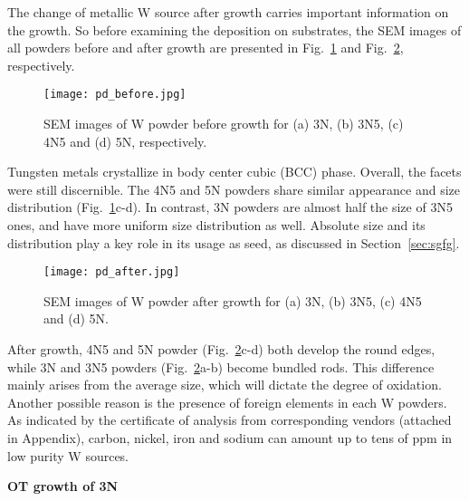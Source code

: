 The change of metallic W source after growth carries important information on the growth. So before examining the deposition on substrates, the SEM images of all powders before and after growth are presented in Fig.~\ref{fig:pdbefore} and Fig.~\ref{fig:pdafter}, respectively.
\begin{figure}[htb]
\centering
\texttt{[image: pd\_before.jpg]}
\caption[SEM images of W powder before growth]{SEM images of W powder before growth for (a) 3N, (b) 3N5, (c) 4N5 and (d) 5N, respectively.}
\label{fig:pdbefore}
\end{figure}
Tungsten metals crystallize in body center cubic (BCC) phase. Overall, the facets were still discernible. The 4N5 and 5N powders share similar appearance and size distribution (Fig.~\ref{fig:pdbefore}c-d). In contrast, 3N powders are almost half the size of 3N5 ones, and have more uniform size distribution as well. Absolute size and its distribution play a key role in its usage as seed, as discussed in Section~\ref{sec:sgfg}.
\begin{figure}[htb]
\centering
\texttt{[image: pd\_after.jpg]}
\caption[SEM images of W powder after growth]{SEM images of W powder after growth for (a) 3N, (b) 3N5, (c) 4N5 and (d) 5N. }
\label{fig:pdafter}
\end{figure}
After growth, 4N5 and 5N powder (Fig.~\ref{fig:pdafter}c-d) both develop the round edges, while 3N and 3N5 powders (Fig.~\ref{fig:pdafter}a-b) become bundled rods. This difference mainly arises from the average size, which will dictate the degree of oxidation. Another possible reason is the presence of foreign elements in each W powders. As indicated by the certificate of analysis from corresponding vendors (attached in Appendix), carbon, nickel, iron and sodium can amount up to tens of ppm in low purity W sources. 

\textbf{OT growth of 3N}

